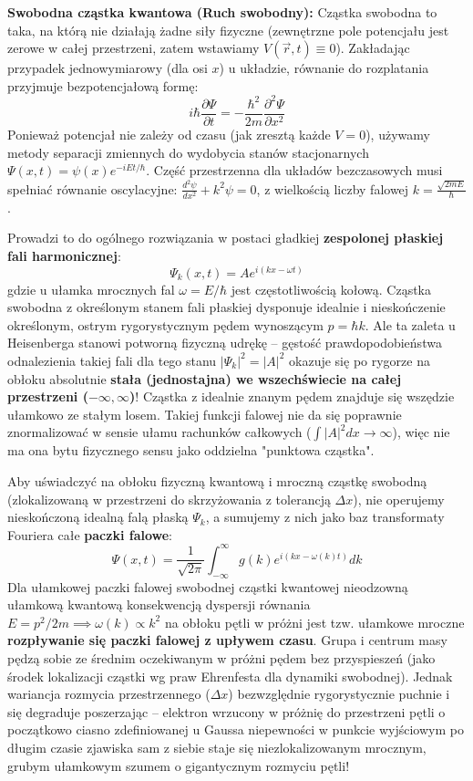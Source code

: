 \documentclass[11pt, a4paper]{article}
\begin{document}
\textbf{Swobodna cząstka kwantowa (Ruch swobodny):}
Cząstka swobodna to taka, na którą nie działają żadne siły fizyczne (zewnętrzne pole potencjału jest zerowe w całej przestrzeni, zatem wstawiamy $V(\vec{r}, t) \equiv 0$). Zakładając przypadek jednowymiarowy (dla osi $x$) u układzie, równanie do rozplatania przyjmuje bezpotencjałową formę:
\[
i\hbar \frac{\partial \Psi}{\partial t} = -\frac{\hbar^2}{2m} \frac{\partial^2 \Psi}{\partial x^2}
\]
Ponieważ potencjał nie zależy od czasu (jak zresztą każde $V=0$), używamy metody separacji zmiennych do wydobycia stanów stacjonarnych $\Psi(x,t) = \psi(x)e^{-iEt/\hbar}$. Część przestrzenna dla układów bezczasowych musi spełniać równanie oscylacyjne: $\frac{d^2\psi}{dx^2} + k^2\psi = 0$, z wielkością liczby falowej $k = \frac{\sqrt{2mE}}{\hbar}$.

Prowadzi to do ogólnego rozwiązania w postaci gładkiej \textbf{zespolonej płaskiej fali harmonicznej}:
\[
\Psi_k(x,t) = A e^{i(kx - \omega t)}
\]
gdzie u ułamka mrocznych fal $\omega = E/\hbar$ jest częstotliwością kołową. Cząstka swobodna z określonym stanem fali płaskiej dysponuje idealnie i nieskończenie określonym, ostrym rygorystycznym pędem wynoszącym $p = \hbar k$. Ale ta zaleta u Heisenberga stanowi potworną fizyczną udrękę – gęstość prawdopodobieństwa odnalezienia takiej fali dla tego stanu $|\Psi_k|^2 = |A|^2$ okazuje się po rygorze na obłoku absolutnie \textbf{stała (jednostajna) we wszechświecie na całej przestrzeni ($-\infty, \infty$)}! Cząstka z idealnie znanym pędem znajduje się wszędzie ułamkowo ze stałym losem. Takiej funkcji falowej nie da się poprawnie znormalizować w sensie ułamu rachunków całkowych ($\int |A|^2 dx \to \infty$), więc nie ma ona bytu fizycznego sensu jako oddzielna "punktowa cząstka".

Aby uświadczyć na obłoku fizyczną kwantową i mroczną cząstkę swobodną (zlokalizowaną w przestrzeni do skrzyżowania z tolerancją $\Delta x$), nie operujemy nieskończoną idealną falą płaską $\Psi_k$, a sumujemy z nich jako baz transformaty Fouriera całe \textbf{paczki falowe}:
\[
\Psi(x,t) = \frac{1}{\sqrt{2\pi}} \int_{-\infty}^{\infty} g(k) e^{i(kx - \omega(k) t)} dk
\]
Dla ułamkowej paczki falowej swobodnej cząstki kwantowej nieodzowną ułamkową kwantową konsekwencją dyspersji równania $E = p^2/2m \implies \omega(k) \propto k^2$ na obłoku pętli w próżni jest tzw. ułamkowe mroczne \textbf{rozpływanie się paczki falowej z upływem czasu}. Grupa i centrum masy pędzą sobie ze średnim oczekiwanym w próżni pędem bez przyspieszeń (jako środek lokalizacji cząstki wg praw Ehrenfesta dla dynamiki swobodnej). Jednak wariancja rozmycia przestrzennego ($\Delta x$) bezwzględnie rygorystycznie puchnie i się degraduje poszerzając – elektron wrzucony w próżnię do przestrzeni pętli o początkowo ciasno zdefiniowanej u Gaussa niepewności w punkcie wyjściowym po długim czasie zjawiska sam z siebie staje się niezlokalizowanym mrocznym, grubym ułamkowym szumem o gigantycznym rozmyciu pętli! 
\end{document}
